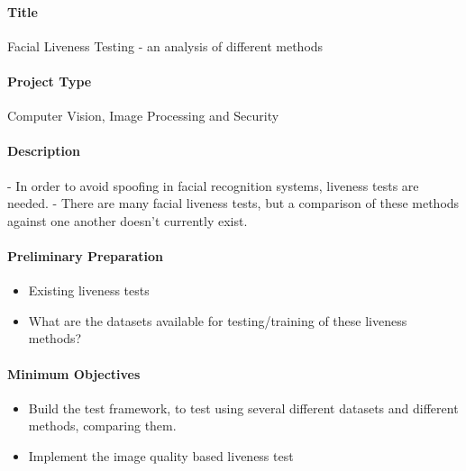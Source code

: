 \documentclass{article}
\begin{document}
    
    \paragraph{Title}
        Facial Liveness Testing - an analysis of different methods
    \paragraph{Project Type}
        Computer Vision, Image Processing and Security
    \paragraph{Description}
        - In order to avoid spoofing in facial recognition systems, liveness tests are needed.
        - There are many facial liveness tests, but a comparison of these methods against one another doesn't currently exist.
    \paragraph{Preliminary Preparation}
        \begin{itemize}
            \item Existing liveness tests
            \item What are the datasets available for testing/training of these liveness methods?
        \end{itemize}
    \paragraph{Minimum Objectives}
        \begin{itemize}
            \item Build the test framework, to test using several different datasets and different methods, comparing them.
            \item Implement the image quality based liveness test
        \end{itemize}
\end{document}
